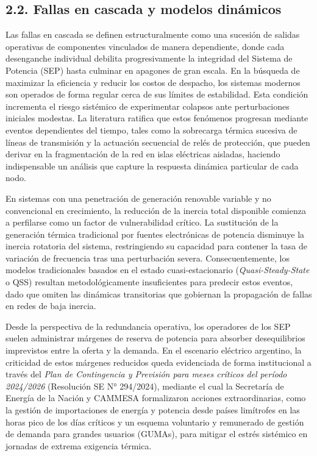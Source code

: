 \hypertarget{fallas-en-cascada-y-modelos-dinuxe1micos}{%
\subsection{2.2. Fallas en cascada y modelos dinámicos}\label{fallas-en-cascada-y-modelos-dinuxe1micos}}

Las fallas en cascada se definen estructuralmente como una sucesión de salidas operativas de componentes vinculados de manera dependiente, donde cada desenganche individual debilita progresivamente la integridad del Sistema de Potencia (SEP) hasta culminar en apagones de gran escala. En la búsqueda de maximizar la eficiencia y reducir los costos de despacho, los sistemas modernos son operados de forma regular cerca de sus límites de estabilidad. Esta condición incrementa el riesgo sistémico de experimentar colapsos ante perturbaciones iniciales modestas. La literatura ratifica que estos fenómenos progresan mediante eventos dependientes del tiempo, tales como la sobrecarga térmica sucesiva de líneas de transmisión y la actuación secuencial de relés de protección, que pueden derivar en la fragmentación de la red en islas eléctricas aisladas, haciendo indispensable un análisis que capture la respuesta dinámica particular de cada nodo.

En sistemas con una penetración de generación renovable variable y no convencional en crecimiento, la reducción de la inercia total disponible comienza a perfilarse como un factor de vulnerabilidad crítico. La sustitución de la generación térmica tradicional por fuentes electrónicas de potencia disminuye la inercia rotatoria del sistema, restringiendo su capacidad para contener la tasa de variación de frecuencia tras una perturbación severa. Consecuentemente, los modelos tradicionales basados en el estado cuasi-estacionario (\emph{Quasi-Steady-State} o QSS) resultan metodológicamente insuficientes para predecir estos eventos, dado que omiten las dinámicas transitorias que gobiernan la propagación de fallas en redes de baja inercia.

Desde la perspectiva de la redundancia operativa, los operadores de los SEP suelen administrar márgenes de reserva de potencia para absorber desequilibrios imprevistos entre la oferta y la demanda. En el escenario eléctrico argentino, la criticidad de estos márgenes reducidos queda evidenciada de forma institucional a través del \emph{Plan de Contingencia y Previsión para meses críticos del período 2024/2026} (Resolución SE N° 294/2024), mediante el cual la Secretaría de Energía de la Nación y CAMMESA formalizaron acciones extraordinarias, como la gestión de importaciones de energía y potencia desde países limítrofes en las horas pico de los días críticos y un esquema voluntario y remunerado de gestión de demanda para grandes usuarios (GUMAs), para mitigar el estrés sistémico en jornadas de extrema exigencia térmica.

